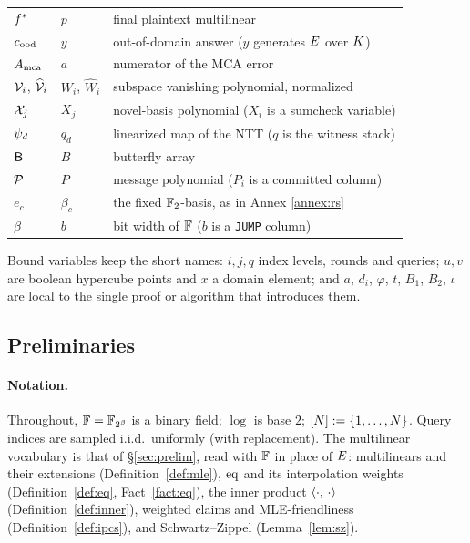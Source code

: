 \begin{center}
\begin{tabular}{@{}lll@{}}
$f^{\ast}$      & $p$          & final plaintext multilinear\\
$c_{\mathrm{ood}}$        & $y$          & out-of-domain answer ($y$ generates $E$ over $K$)\\
$A_{\mathrm{mca}}$      & $a$          & numerator of the MCA error\\
$\mathcal{V}_i$, $\widehat{\mathcal{V}}_{i}$ & $W_i$, $\widehat W_i$ & subspace vanishing polynomial, normalized\\
$\mathcal{X}_j$     & $X_j$        & novel-basis polynomial ($X_i$ is a sumcheck variable)\\
$\psi_d$     & $q_d$        & linearized map of the NTT ($q$ is the witness stack)\\
$\mathsf{B}$       & $B$          & butterfly array\\
$\mathcal{P}$       & $P$          & message polynomial ($P_i$ is a committed column)\\
$e_c$          & $\beta_c$    & the fixed $\mathbb{F}_2$-basis, as in Annex \ref{annex:rs}\\
$\beta$        & $b$          & bit width of $\mathbb{F}$ ($b$ is a \texttt{JUMP} column)\\
\hline
\end{tabular}
\end{center}

\noindent Bound variables keep the short names: $i,j,q$ index levels, rounds and queries; $u,v$ are boolean hypercube points and $x$ a domain element; and $a$, $d_i$, $\varphi$, $t$, $B_1$, $B_2$, $\iota$ are local to the single proof or algorithm that introduces them.

\subsection{Preliminaries}\label{sec:prelims}

\paragraph{Notation.}
Throughout, $\mathbb{F} = \mathbb{F}_{2^{\beta}}$ is a binary field; $\log$ is base $2$; $[N] := \{1,\dots,N\}$. Query indices are sampled i.i.d.\ uniformly (with replacement). The multilinear vocabulary is that of \S\ref{sec:prelim}, read with $\mathbb{F}$ in place of $E$: multilinears and their extensions (Definition~\ref{def:mle}), $\operatorname{eq}$ and its interpolation weights (Definition~\ref{def:eq}, Fact~\ref{fact:eq}), the inner product $\langle \cdot,\, \cdot \rangle$ (Definition~\ref{def:inner}), weighted claims and MLE-friendliness (Definition~\ref{def:ipcs}), and Schwartz--Zippel (Lemma~\ref{lem:sz}).

